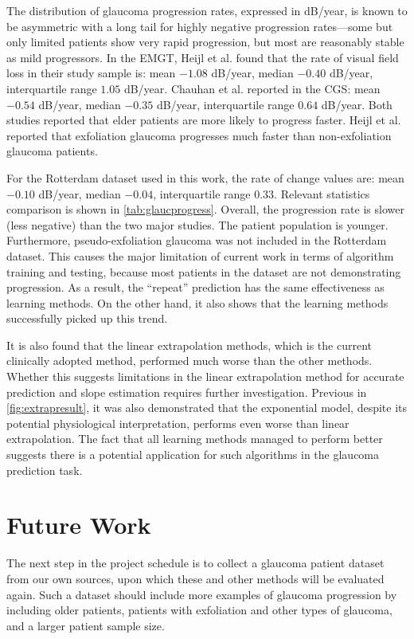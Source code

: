 The distribution of glaucoma progression rates, expressed in dB/year, is known to be asymmetric with a long tail for highly negative progression rates---some but only limited patients show very rapid progression, but most are reasonably stable as mild progressors. \cite{Anderson2015} In the \ac{EMGT}, Heijl et al. found that the rate of visual field loss in their study sample is: mean $-1.08$ dB/year, median $-0.40$ dB/year, interquartile range $1.05$ dB/year. \cite{Heijl2009} Chauhan et al. reported in the \ac{CGS}: mean $-0.54$ dB/year, median $-0.35$ dB/year, interquartile range $0.64$ dB/year. \cite{Group2010} Both studies reported that elder patients are more likely to progress faster. Heijl et al. reported that exfoliation glaucoma progresses much faster than non-exfoliation glaucoma patients. 

For the Rotterdam dataset used in this work, the rate of change values are: mean $-0.10$ dB/year, median $-0.04$, interquartile range $0.33$. Relevant statistics comparison is shown in \cref{tab:glaucprogress}. Overall, the progression rate is slower (less negative) than the two major studies. The patient population is younger. Furthermore, pseudo-exfoliation glaucoma was not included in the Rotterdam dataset. This causes the major limitation of current work in terms of algorithm training and testing, because most patients in the dataset are not demonstrating progression. As a result, the ``repeat'' prediction has the same effectiveness as learning methods. On the other hand, it also shows that the learning methods successfully picked up this trend. 

It is also found that the linear extrapolation methods, which is the current clinically adopted method, performed much worse than the other methods. Whether this suggests limitations in the linear extrapolation method for accurate prediction and slope estimation requires further investigation. Previous in \cref{fig:extrapresult}, it was also demonstrated that the exponential model, despite its potential physiological interpretation, performs even worse than linear extrapolation. The fact that all learning methods managed to perform better suggests there is a potential application for such algorithms in the glaucoma prediction task. 

\section{Future Work}

The next step in the project schedule is to collect a glaucoma patient dataset from our own sources, upon which these and other methods will be evaluated again. Such a dataset should include more examples of glaucoma progression by including older patients, patients with exfoliation and other types of glaucoma, and a larger patient sample size. 

